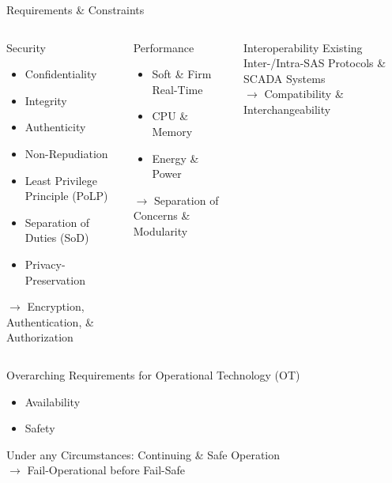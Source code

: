 \documentclass[en]{sdqbeamer}
\begin{document}
\begin{frame}[allowframebreaks]{Requirements \& Constraints}
    \begin{columns}
        \begin{blueblock}{Security}
            \begin{itemize}
                \item Confidentiality
                \item Integrity
                \item Authenticity
                \item Non-Repudiation
                \item Least Privilege Principle (PoLP)
                \item Separation of Duties (SoD)
                \item Privacy-Preservation
            \end{itemize}
            $\rightarrow$ Encryption, Authentication, \& Authorization
        \end{blueblock}
        \begin{blueblock}{Performance}
            \begin{itemize}
                \item Soft \& Firm Real-Time
                \item CPU \& Memory
                \item Energy \& Power
            \end{itemize}
            $\rightarrow$ Separation of Concerns \& Modularity
        \end{blueblock}
        \begin{blueblock}{Interoperability}
             Existing Inter-/Intra-SAS Protocols \& SCADA Systems
             \\$\rightarrow$ Compatibility \& Interchangeability
        \end{blueblock}
    \end{columns}
    \framebreak
    \begin{redblock}{Overarching Requirements for Operational Technology (OT)}
        \begin{itemize}
            \item Availability
            \item Safety
        \end{itemize}
        Under any Circumstances: Continuing \& Safe Operation
        \\$\rightarrow$ Fail-Operational before Fail-Safe
    \end{redblock}
\end{frame}
\end{document}
